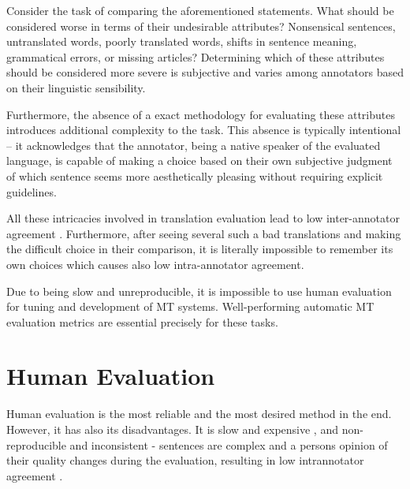 Consider the task of comparing the aforementioned statements. What should be considered worse in terms of their undesirable attributes? Nonsensical sentences, untranslated words, poorly translated words, shifts in sentence meaning, grammatical errors, or missing articles? Determining which of these attributes should be considered more severe is subjective and varies among annotators based on their linguistic sensibility.

Furthermore, the absence of a exact methodology for evaluating these attributes introduces additional complexity to the task. This absence is typically intentional -- it acknowledges that the annotator, being a native speaker of the evaluated language,  is capable of making a choice based on their own subjective judgment of which sentence seems more aesthetically pleasing without requiring explicit guidelines.


All these intricacies involved in translation evaluation lead to low inter-annotator agreement \cite{wmt13}. 
Furthermore, after seeing several such a bad translations and making the difficult choice in their comparison, it is literally impossible to remember its own choices which causes also low intra-annotator agreement.

Due to being slow and unreproducible, it is impossible to use human evaluation for tuning and development of MT systems. 
Well-performing automatic MT evaluation metrics are essential precisely for these tasks. 









\section{Human Evaluation}
Human evaluation is the most reliable and the most desired method in the end.
However, it has also its disadvantages. 
It is slow and expensive , and non-reproducible and inconsistent - sentences are complex and a persons opinion of their quality changes during the evaluation, resulting in low intrannotator agreement .


